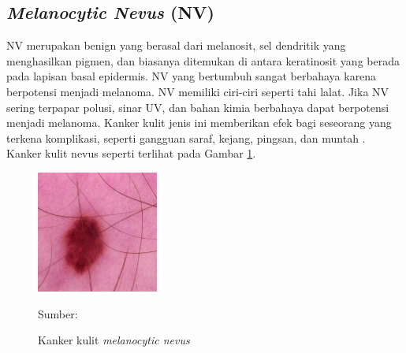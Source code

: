     \subsection{\textit{Melanocytic Nevus} (NV)}
    NV merupakan benign yang berasal dari melanosit, sel dendritik yang menghasilkan pigmen, dan biasanya ditemukan di antara keratinosit yang berada pada lapisan basal epidermis. NV yang bertumbuh sangat berbahaya karena berpotensi menjadi melanoma. NV memiliki ciri-ciri seperti tahi lalat. Jika NV sering terpapar polusi, sinar UV, dan bahan kimia berbahaya dapat berpotensi menjadi melanoma. Kanker kulit jenis ini memberikan efek bagi seseorang yang terkena komplikasi, seperti gangguan saraf, kejang, pingsan, dan muntah \citep{Fuadah2020a}. Kanker kulit nevus seperti terlihat pada Gambar \ref{fig:nv}.
    \begin{figure}[H] 
        \begin{center} 
            \includegraphics[width=4cm]{../img/Skin Cancer NV - Latex.jpg}
            \caption{Kanker kulit \textit{melanocytic nevus}} 
            \label{fig:nv}
            Sumber: \citep{Codella2018,Combalia2019,Tschandl2018}
        \end{center} 
    \end{figure}

